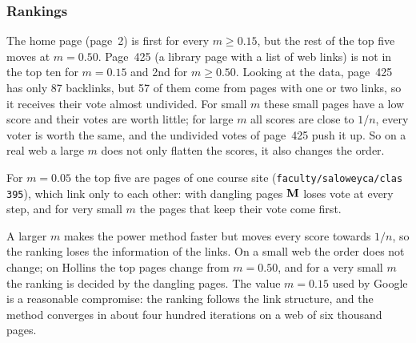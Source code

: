

\subsubsection*{Rankings}

The home page (page~2) is first for every $m \ge 0.15$, but the rest of the top five moves at $m = 0.50$.
Page~425 (a library page with a list of web links) is not in the top ten for $m = 0.15$ and 2nd for $m \ge 0.50$.
Looking at the data, page~425 has only 87 backlinks, but 57 of them come from pages with one or two links, so it receives their vote almost undivided.
For small $m$ these small pages have a low score and their votes are worth little; for large $m$ all scores are close to $1/n$, every voter is worth the same, and the undivided votes of page~425 push it up.
So on a real web a large $m$ does not only flatten the scores, it also changes the order.

For $m = 0.05$ the top five are pages of one course site (\texttt{faculty/saloweyca/clas 395}), which link only to each other: with dangling pages $\mathbf{M}$ loses vote at every step, and for very small $m$ the pages that keep their vote come first.


A larger $m$ makes the power method faster but moves every score towards $1/n$, so the ranking loses the information of the links.
On a small web the order does not change; on Hollins the top pages change from $m = 0.50$, and for a very small $m$ the ranking is decided by the dangling pages.
The value $m = 0.15$ used by Google is a reasonable compromise: the ranking follows the link structure, and the method converges in about four hundred iterations on a web of six thousand pages.